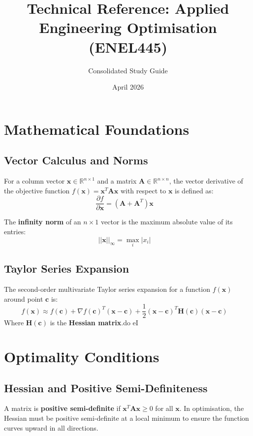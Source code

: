 \documentclass[11pt]{article}
\title{Technical Reference: Applied Engineering Optimisation (ENEL445)}
\author{Consolidated Study Guide}
\date{April 2026}
\begin{document}
\maketitle

\section{Mathematical Foundations}

\subsection{Vector Calculus and Norms}
For a column vector $\mathbf{x} \in \mathbb{R}^{n \times 1}$ and a matrix $\mathbf{A} \in \mathbb{R}^{n \times n}$, the vector derivative of the objective function $f(\mathbf{x}) = \mathbf{x}^T \mathbf{A} \mathbf{x}$ with respect to $\mathbf{x}$ is defined as:
\begin{equation}
\frac{\partial f}{\partial \mathbf{x}} = (\mathbf{A} + \mathbf{A}^T)\mathbf{x} \quad
\end{equation}

The \textbf{infinity norm} of an $n \times 1$ vector is the maximum absolute value of its entries:
\begin{equation}
||\mathbf{x}||_\infty = \max_{i} |x_i| \quad
\end{equation}

\subsection{Taylor Series Expansion}
The second-order multivariate Taylor series expansion for a function $f(\mathbf{x})$ around point $\mathbf{c}$ is:
\begin{equation}
f(\mathbf{x}) \approx f(\mathbf{c}) + \nabla f(\mathbf{c})^T (\mathbf{x} - \mathbf{c}) + \frac{1}{2}(\mathbf{x} - \mathbf{c})^T \mathbf{H}(\mathbf{c}) (\mathbf{x} - \mathbf{c}) \quad
\end{equation}
Where $\mathbf{H}(\mathbf{c})$ is the \textbf{Hessian matrix}.do eI 

\section{Optimality Conditions}

\subsection{Hessian and Positive Semi-Definiteness}
A matrix is \textbf{positive semi-definite} if $\mathbf{x}^T \mathbf{A} \mathbf{x} \geq 0$ for all $\mathbf{x}$. In optimisation, the Hessian must be positive semi-definite at a local minimum to ensure the function curves upward in all directions.
\end{document}
